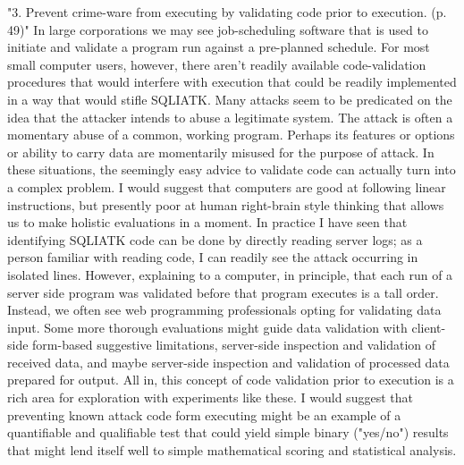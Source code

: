 "3. Prevent crime-ware from executing by validating code prior to execution. (p. 49)"  In large corporations we may see job-scheduling software that is used to initiate and validate a program run against a pre-planned schedule.  For most small computer users, however, there aren't readily available code-validation procedures that would interfere with execution that could be readily implemented in a way that would stifle SQLIATK.  Many attacks seem to be predicated on the idea that the attacker intends to abuse a legitimate system.  The \gls{attack} is often a momentary abuse of a common, working program.  Perhaps its features or options or ability to carry data are momentarily misused for the purpose of \gls{attack}.  In these situations, the seemingly easy advice to validate code can actually turn into a complex problem.  I would suggest that computers are good at following linear instructions, but presently poor at human right-brain style thinking that allows us to make holistic evaluations in a moment.  In practice I have seen that identifying SQLIATK code can be done by directly reading server logs; as a person familiar with reading code, I can readily see the \gls{attack} occurring in isolated lines.  However, explaining to a computer, in principle, that each run of a server side program was validated before that program executes is a tall order.  Instead, we often see web programming professionals opting for validating data input.  Some more thorough evaluations might guide data validation with client-side form-based suggestive limitations, server-side inspection and validation of received data, and maybe server-side inspection and validation of processed data prepared for output.  All in, this concept of code validation prior to execution is a rich area for exploration with experiments like these.  I would suggest that preventing known \gls{attack} code form executing might be an example of a quantifiable and qualifiable test that could yield simple \gls{binary} ("yes/no") results that might lend itself well to simple mathematical scoring and statistical analysis.

